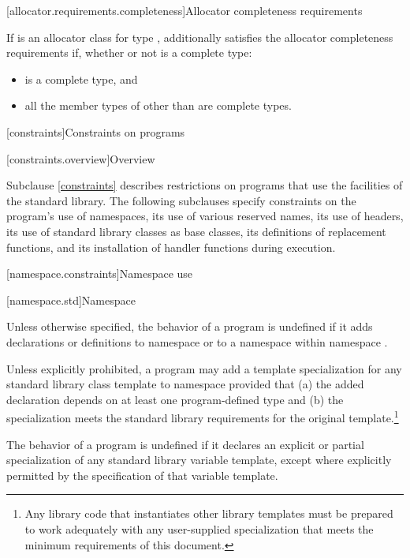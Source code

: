 [allocator.requirements.completeness]{Allocator completeness requirements}

\pnum
If  is an allocator class for type ,
 additionally satisfies the allocator completeness requirements if,
whether or not  is a complete type:

\begin{itemize}
\item {} is a complete type, and
\item all the member types of 
  other than  are complete types.
\end{itemize}

[constraints]{Constraints on programs}

[constraints.overview]{Overview}

\pnum
Subclause \ref{constraints} describes restrictions on \Cpp{} programs that use the facilities of
the \Cpp{} standard library. The following subclauses specify constraints on the
program's use of namespaces, its use of various reserved
names, its use of headers, its use of
standard library classes as base classes, its
definitions of replacement functions, and its
installation of handler functions during execution.

[namespace.constraints]{Namespace use}

[namespace.std]{Namespace }

\pnum
Unless otherwise specified,
the behavior of a \Cpp{} program is undefined if it adds declarations or definitions to namespace
or to a namespace within namespace
.

\pnum
Unless explicitly prohibited,
a program may add a template specialization for
any standard library class template
to namespace
 provided that
(a) the added declaration
depends on at least one program-defined type
and
(b) the specialization meets the standard library requirements
for the original template.\footnote{Any
library code that instantiates other library templates
must be prepared to work adequately with any user-supplied specialization
that meets the minimum requirements of this document.}

\pnum
The behavior of a \Cpp{} program is undefined
if it declares an explicit or partial specialization
of any standard library variable template,
except where explicitly permitted by the specification of that variable template.

